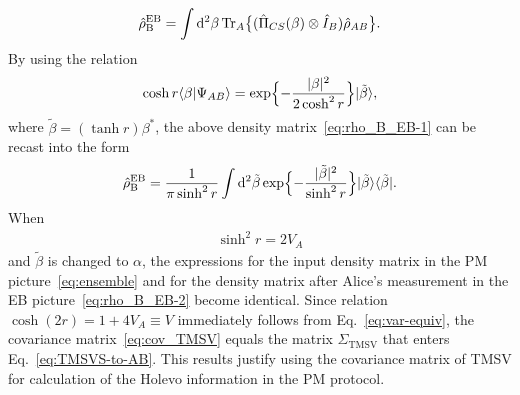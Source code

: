 \documentclass[%
reprint,
superscriptaddress,
 amsmath,amssymb,amsfonts,
 aps,
 pra,
 longbibliography
]{revtex4-2}
\newcommand{\ket}[1]{\ensuremath{|{#1}\rangle}}
\newcommand{\bra}[1]{\ensuremath{\langle{#1}|}}
\newcommand{\avr}[1]{\ensuremath{\langle{#1}\rangle}}
\newcommand{\cnj}[1]{{#1}^{\ast}}
\newcommand{\Tr}{\mathop{\rm Tr}\nolimits}
\newcommand{\ind}[1]{\mathrm{#1}}
\newcommand{\dd}{\mathrm{d}}
\begin{document}
\begin{align}
  \label{eq:rho_B_EB-1}
  \hat{\rho}_{\ind{B}}^{\ind{EB}}=\int\dd^2\beta \Tr_A \bigl\{(\hat{\Pi}_{CS}(\beta)\otimes\hat{I}_B) \hat{\rho}_{AB}\bigr\}.
\end{align}
By using the relation
\begin{align}
  \label{eq:beta-psi_AB}
  \cosh r \avr{\beta|\Psi_{AB}}=
  \exp\Bigl\{-\frac{|\beta|^2}{2\cosh^2r}\Bigr\} \ket{\tilde{\beta}},
\end{align}
where $\tilde\beta=(\tanh r)\cnj{\beta}$,
the above density matrix~\eqref{eq:rho_B_EB-1}
can be recast into the form
\begin{align}
  \label{eq:rho_B_EB-2}
  \hat{\rho}_{\ind{B}}^{\ind{EB}}=
\frac{1}{\pi \sinh^2 r}
  \int\dd^2\tilde{\beta}
  \exp\Bigl\{-\frac{|\tilde{\beta}|^2}{\sinh^2 r}\Bigr\}
  \ket{\tilde{\beta}}\bra{\tilde{\beta}}.
\end{align}
When
\begin{align}
  \label{eq:var-equiv}
  \sinh^2 r = 2 V_A
\end{align}
and $\tilde\beta$ is changed to $\alpha$,
the expressions for
the input density matrix
in the PM picture~\eqref{eq:ensemble}
and
for the density matrix after Alice's measurement
in the EB picture~\eqref{eq:rho_B_EB-2}
become identical.
Since relation
$\cosh(2r)=1+4V_A\equiv V$ immediately follows from Eq.~\eqref{eq:var-equiv},
the covariance matrix~\eqref{eq:cov_TMSV}
equals
the matrix $\Sigma_{\ind{TMSV}}$
that enters Eq.~\eqref{eq:TMSVS-to-AB}.
This results justify using
the covariance matrix of TMSV
for calculation of the Holevo information in the PM protocol.



\end{document}
